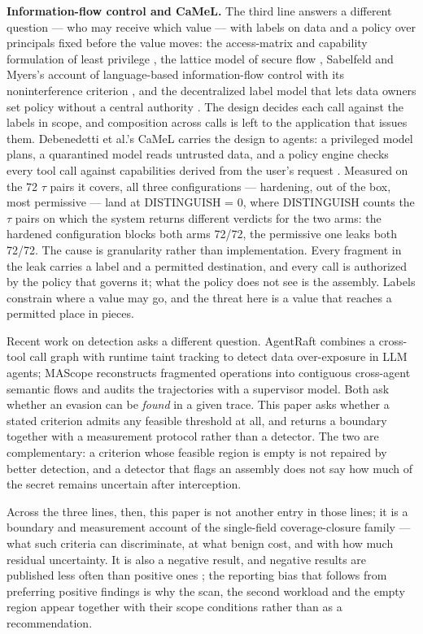 \documentclass[preprint,12pt]{elsarticle}
\begin{document}
\textbf{Information-flow control and CaMeL.} The third line answers a different question --- who
may receive which value --- with labels on data and a policy over principals fixed before the value
moves: the access-matrix and capability formulation of least privilege
\cite{saltzer1975protection,dennis1966programming}, the lattice model of secure flow
\cite{denning1976lattice}, Sabelfeld and Myers's account of language-based information-flow control
with its noninterference criterion \cite{sabelfeld2003language}, and the decentralized label model
that lets data owners set policy without a central authority \cite{myers1997decentralized}. The
design decides each call against the labels in scope, and composition across calls is left to the
application that issues them. Debenedetti et al.'s CaMeL carries the design to agents: a privileged
model plans, a quarantined model reads untrusted data, and a policy engine checks every tool call
against capabilities derived from the user's request \cite{debenedetti2025defeating}. Measured on
the 72 $\tau$ pairs it covers, all three configurations --- hardening, out of the box, most
permissive --- land at DISTINGUISH = 0, where DISTINGUISH counts the $\tau$ pairs on which the
system returns different verdicts for the two arms: the hardened configuration blocks both arms
72/72, the permissive one leaks both 72/72. The cause is granularity rather than implementation.
Every fragment in the leak carries a label and a permitted destination, and every call is
authorized by the policy that governs it; what the policy does not see is the assembly. Labels
constrain where a value may go, and the threat here is a value that reaches a permitted place in
pieces.

Recent work on detection asks a different question. AgentRaft \cite{lin2026agentraft}
combines a cross-tool call graph with runtime taint tracking to detect data over-exposure in LLM
agents; MAScope \cite{wei2026mascope} reconstructs fragmented operations into contiguous
cross-agent semantic flows and audits the trajectories with a supervisor model. Both ask whether
an evasion can be \emph{found} in a given trace. This
paper asks whether a stated criterion admits any feasible threshold at all, and returns a
boundary together with a measurement protocol rather than a detector. The two are complementary:
a criterion whose feasible region is empty is not repaired by better detection, and a detector
that flags an assembly does not say how much of the secret remains uncertain after interception.

Across the three lines, then, this paper is not another entry in those lines; it is a boundary and
measurement account of the single-field coverage-closure family --- what such criteria can
discriminate, at what benign cost, and with how much residual uncertainty. It is also a negative
result, and negative results are published less often than positive ones \cite{fanelli2011negative};
the reporting bias that follows from preferring positive findings \cite{ioannidis2005why} is why
the scan, the second workload and the empty region appear together with their scope conditions
rather than as a recommendation.
\end{document}

